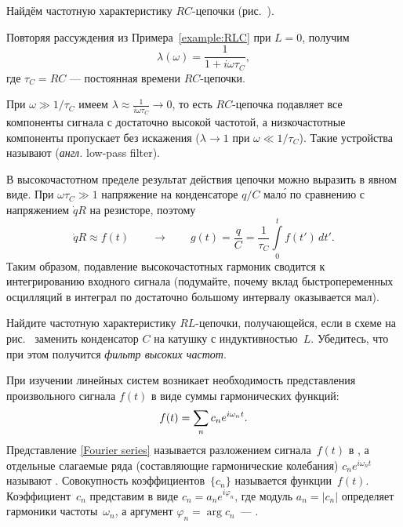 \begin{lab:example}\label{example:RC}
Найдём частотную характеристику $RC$-цепочки (рис.~).

Повторяя рассуждения из Примера~\ref{example:RLC} при $L=0$, получим
\begin{equation*}
\lambda(\omega) = \frac{1}{1+i\omega \tau_C},
\end{equation*}
где $\tau_C=RC$ --- постоянная времени $RC$-цепочки.

При $\omega \gg 1/\tau_C$ имеем $\lambda \approx \frac{1}{i\omega\tau_C} \to 0$,
то есть $RC$-цепочка подавляет все компоненты сигнала с достаточно высокой
частотой, а низкочастотные компоненты пропускает без искажения
($\lambda\to1$ при $\omega \ll 1/\tau_C$). 
Такие устройства называют 
(\emph{англ.} low-pass filter).

В высокочастотном пределе результат действия цепочки можно выразить в явном виде.
При $\omega\tau_C\gg1$ напряжение на конденсаторе $q/C$ мал\'{о} по сравнению
с напряжением $\dot{q}R$ на резисторе, поэтому
\begin{equation*}
\dot{q} R \approx f(t) \qquad \to \qquad g(t) = \frac{q}{C} = \frac{1}{\tau_C}\int\limits_0^t f(t')\,dt'.
\end{equation*}
Таким образом, подавление высокочастотных гармоник сводится к интегрированию
входного сигнала (подумайте, почему вклад быстропеременных осцилляций
в интеграл по достаточно большому интервалу оказывается мал).
\end{lab:example}

\begin{lab:exercise}
    Найдите частотную характеристику $RL$-цепочки,
    получающейся, если в схеме на рис.~ заменить конденсатор $C$
    на катушку с индуктивностью~$L$. Убедитесь, что при этом
    получится \emph{фильтр высоких частот}.
\end{lab:exercise}

\label{sec:spectrum}

При изучении линейных систем возникает необходимость
представления произвольного сигнала $f(t)$ в виде
суммы гармонических функций:
\begin{equation}
    \eqmark{Fourier series}
    f(t)=\sum\limits_n c_n e^{i\omega_n t}.
\end{equation}
Представление \eqref{Fourier series} называется разложением сигнала~$f(t)$ в
, а отдельные слагаемые ряда (составляющие
гармонические колебания) $c_n e^{i\omega_n t}$ называют .
Совокупность коэффициентов~$\{c_n\}$ называется  функции~$f(t)$.
Коэффициент~$c_n$ представим в виде $c_n=a_ne^{i\varphi_n}$, где
модуль $a_n=|c_n|$ определяет  гармоники частоты~$\omega_n$,
а аргумент $\varphi_n=\arg c_n$~--- .

